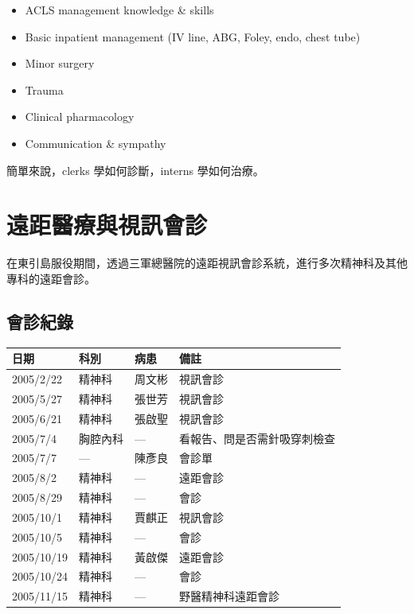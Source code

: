 \documentclass[12pt,a4paper]{article}
\newenvironment{myquote}{%
    \begin{tcolorbox}[
        colback=quote_bg,
        colframe=emergency_gray,
        boxrule=0pt,
        leftrule=3pt,
        arc=0pt,
        left=10pt,
        right=10pt,
        top=8pt,
        bottom=8pt
    ]
    \itshape
}{%
    \end{tcolorbox}
}
\begin{document}
\begin{itemize}
    \item ACLS management knowledge \& skills
    \item Basic inpatient management (IV line, ABG, Foley, endo, chest tube)
    \item Minor surgery
    \item Trauma
    \item Clinical pharmacology
    \item Communication \& sympathy
\end{itemize}

\begin{myquote}
簡單來說，clerks 學如何診斷，interns 學如何治療。
\end{myquote}

\section{遠距醫療與視訊會診}

在東引島服役期間，透過三軍總醫院的遠距視訊會診系統，進行多次精神科及其他專科的遠距會診。

\subsection{會診紀錄}

\begin{longtable}{p{2.5cm}p{3cm}p{3cm}p{5cm}}
\toprule
\textbf{日期} & \textbf{科別} & \textbf{病患} & \textbf{備註} \\
\midrule
\endhead
2005/2/22 & 精神科 & 周文彬 & 視訊會診 \\
2005/5/27 & 精神科 & 張世芳 & 視訊會診 \\
2005/6/21 & 精神科 & 張啟聖 & 視訊會診 \\
2005/7/4 & 胸腔內科 & — & 看報告、問是否需針吸穿刺檢查 \\
2005/7/7 & — & 陳彥良 & 會診單 \\
2005/8/2 & 精神科 & — & 遠距會診 \\
2005/8/29 & 精神科 & — & 會診 \\
2005/10/1 & 精神科 & 賈麒正 & 視訊會診 \\
2005/10/5 & 精神科 & — & 會診 \\
2005/10/19 & 精神科 & 黃啟傑 & 遠距會診 \\
2005/10/24 & 精神科 & — & 會診 \\
2005/11/15 & 精神科 & — & 野醫精神科遠距會診 \\
\bottomrule
\end{longtable}
\end{document}
